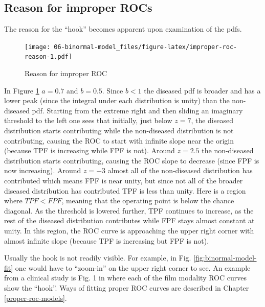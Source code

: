 \documentclass[
]{book}
\begin{document}
\hypertarget{reason-for-improper-rocs}{%
\subsection{Reason for improper ROCs}\label{reason-for-improper-rocs}}

The reason for the ``hook'' becomes apparent upon examination of the pdfs.

\begin{figure}
\centering
\texttt{[image: 06-binormal-model\_files/figure-latex/improper-roc-reason-1.pdf]}
\caption{\label{fig:improper-roc-reason}Reason for improper ROC}
\end{figure}

In Figure \ref{fig:improper-roc-reason} \(a = 0.7\) and \(b = 0.5\). Since \(b < 1\) the diseased pdf is broader and has a lower peak (since the integral under each distribution is unity) than the non-diseased pdf. Starting from the extreme right and then sliding an imaginary threshold to the left one sees that initially, just below \(z = 7\), the diseased distribution starts contributing while the non-diseased distribution is not contributing, causing the ROC to start with infinite slope near the origin (because TPF is increasing while FPF is not). Around \(z = 2.5\) the non-diseased distribution starts contributing, causing the ROC slope to decrease (since FPF is now increasing). Around \(z = -3\) almost all of the non-diseased distribution has contributed which means FPF is near unity, but since not all of the broader diseased distribution has contributed TPF is less than unity. Here is a region where \(TPF < FPF\), meaning that the operating point is below the chance diagonal. As the threshold is lowered further, TPF continues to increase, as the rest of the diseased distribution contributes while FPF stays almost constant at unity. In this region, the ROC curve is approaching the upper right corner with almost infinite slope (because TPF is increasing but FPF is not).

Usually the hook is not readily visible. For example, in Fig. \ref{fig:binormal-model-fit} one would have to ``zoom-in'' on the upper right corner to see. An example from a clinical study is Fig. 1 in \citep{pisano2005diagnostic} where each of the film modality ROC curves show the ``hook''. Ways of fitting proper ROC curves are described in Chapter \ref{proper-roc-models}.
\end{document}
